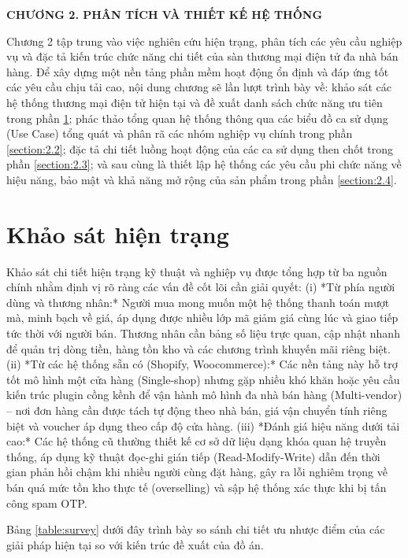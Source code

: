 \documentclass[../DoAn.tex]{subfiles}
\begin{document}
\begin{center}
    \Large{\textbf{CHƯƠNG 2. PHÂN TÍCH VÀ THIẾT KẾ HỆ THỐNG}}\\
\end{center}
\vspace{1cm}

Chương 2 tập trung vào việc nghiên cứu hiện trạng, phân tích các yêu cầu nghiệp vụ và đặc tả kiến trúc chức năng chi tiết của sàn thương mại điện tử đa nhà bán hàng. Để xây dựng một nền tảng phần mềm hoạt động ổn định và đáp ứng tốt các yêu cầu chịu tải cao, nội dung chương sẽ lần lượt trình bày về: khảo sát các hệ thống thương mại điện tử hiện tại và đề xuất danh sách chức năng ưu tiên trong phần \ref{section:2.1}; phác thảo tổng quan hệ thống thông qua các biểu đồ ca sử dụng (Use Case) tổng quát và phân rã các nhóm nghiệp vụ chính trong phần \ref{section:2.2}; đặc tả chi tiết luồng hoạt động của các ca sử dụng then chốt trong phần \ref{section:2.3}; và sau cùng là thiết lập hệ thống các yêu cầu phi chức năng về hiệu năng, bảo mật và khả năng mở rộng của sản phẩm trong phần \ref{section:2.4}.

\section{Khảo sát hiện trạng}
\label{section:2.1}
Khảo sát chi tiết hiện trạng kỹ thuật và nghiệp vụ được tổng hợp từ ba nguồn chính nhằm định vị rõ ràng các vấn đề cốt lõi cần giải quyết:
(i) *Từ phía người dùng và thương nhân:* Người mua mong muốn một hệ thống thanh toán mượt mà, minh bạch về giá, áp dụng được nhiều lớp mã giảm giá cùng lúc và giao tiếp tức thời với người bán. Thương nhân cần bảng số liệu trực quan, cập nhật nhanh để quản trị dòng tiền, hàng tồn kho và các chương trình khuyến mãi riêng biệt.
(ii) *Từ các hệ thống sẵn có (Shopify, Woocommerce):* Các nền tảng này hỗ trợ tốt mô hình một cửa hàng (Single-shop) nhưng gặp nhiều khó khăn hoặc yêu cầu kiến trúc plugin cồng kềnh để vận hành mô hình đa nhà bán hàng (Multi-vendor) – nơi đơn hàng cần được tách tự động theo nhà bán, giá vận chuyển tính riêng biệt và voucher áp dụng theo cấp độ cửa hàng.
(iii) *Đánh giá hiệu năng dưới tải cao:* Các hệ thống cũ thường thiết kế cơ sở dữ liệu dạng khóa quan hệ truyền thống, áp dụng kỹ thuật đọc-ghi gián tiếp (Read-Modify-Write) dẫn đến thời gian phản hồi chậm khi nhiều người cùng đặt hàng, gây ra lỗi nghiêm trọng về bán quá mức tồn kho thực tế (overselling) và sập hệ thống xác thực khi bị tấn công spam OTP.

Bảng \ref{table:survey} dưới đây trình bày so sánh chi tiết ưu nhược điểm của các giải pháp hiện tại so với kiến trúc đề xuất của đồ án.
\end{document}
